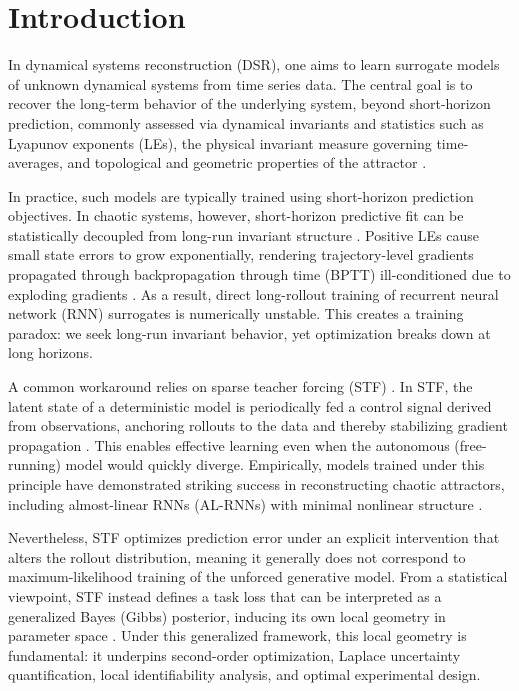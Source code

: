 \documentclass[twoside]{article}
\theoremstyle{plain}
\theoremstyle{definition}
\theoremstyle{remark}
\begin{document}
\section{Introduction}
\vspace{-0.5em}
In dynamical systems reconstruction (DSR), one aims to learn surrogate models of unknown dynamical systems from time series data. The central goal is to recover the long-term behavior of the underlying system, beyond short-horizon prediction, commonly assessed via dynamical invariants and statistics such as Lyapunov exponents (LEs), the physical invariant measure governing time-averages, and topological and geometric properties of the attractor \citep{durstewitz2023reconstructing,goering2024oodg}. 

In practice, such models are typically trained using short-horizon prediction objectives. In chaotic systems, however, short-horizon predictive fit can be statistically decoupled from long-run invariant structure \citep{park2024statisticallyaccurate}. Positive LEs cause small state errors to grow exponentially, rendering trajectory-level gradients propagated through backpropagation through time (BPTT) ill-conditioned due to exploding gradients \citep{mikhaeil2022chaosrnn}. As a result, direct long-rollout training of recurrent neural network (RNN) surrogates is numerically unstable. This creates a training paradox: we seek long-run invariant behavior, yet optimization breaks down at long horizons.

A common workaround relies on sparse teacher forcing (STF) \citep{mikhaeil2022chaosrnn}. In STF, the latent state of a deterministic model is periodically fed a control signal derived from observations, anchoring rollouts to the data and thereby stabilizing gradient propagation \citep{mikhaeil2022chaosrnn}. This enables effective learning even when the autonomous (free-running) model would quickly diverge. Empirically, models trained under this principle have demonstrated striking success in reconstructing chaotic attractors, including almost-linear RNNs (AL-RNNs) with minimal nonlinear structure \citep{hess2023gtf,brenner2024alrnn}.

Nevertheless, STF optimizes prediction error under an explicit intervention that alters the rollout distribution, meaning it generally does not correspond to maximum-likelihood training of the unforced generative model. From a statistical viewpoint, STF instead defines a task loss that can be interpreted as a generalized Bayes (Gibbs) posterior, inducing its own local geometry in parameter space \citep{catoni2007pacbayes, bissiri2016generalbayes}. Under this generalized framework, this local geometry is fundamental: it underpins second-order optimization, Laplace uncertainty quantification, local identifiability analysis, and optimal experimental design.
\end{document}

